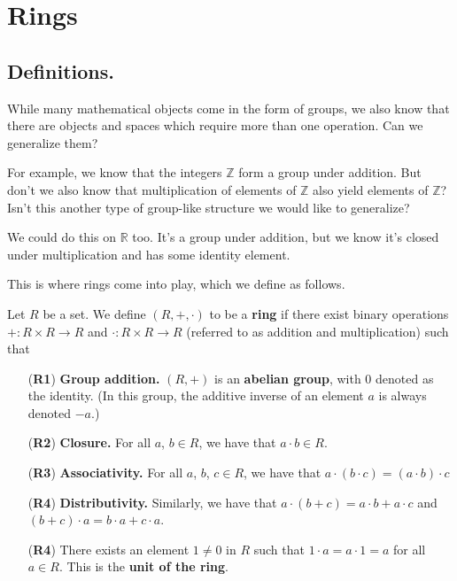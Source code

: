 \chapter{Rings}
\section{Definitions.}

While many mathematical objects come in the form of groups, we
also know that there are objects and spaces which require more
than one operation. Can we generalize them?

For example, we know that the integers $\mathbb{Z}$ form a group
under addition. But don't we also know that multiplication of
elements of $\mathbb{Z}$ also yield elements of $\mathbb{Z}$?
Isn't this another type of group-like structure we would like to
generalize?

We could do this on $\mathbb{R}$ too. It's a group under addition,
but we know it's closed under multiplication and has some identity
element.

This is where rings come into play, which we define as follows. 

\begin{definition}
    Let $R$ be a set. We define $(R, +, \cdot)$ to be a \textbf{ring} if there
    exist binary operations $+: R\times R \to R$ and $\cdot: R
    \times R \to R$ (referred to as addition and multiplication)
    such that 
    \begin{itemize}
        \item[(\textbf{R1})] \textbf{Group addition.} $(R, +)$ is an
        \textbf{abelian group}, with $0$ denoted as the
        identity. (In this group, the additive inverse of
        an element $a$ is always denoted $-a$.)
        \item[(\textbf{R2})] \textbf{Closure.} For all $a$, $b \in R$, we have that $a \cdot b \in R$.
        \item[(\textbf{R3})] \textbf{Associativity.} For all $a$, $b$, $c \in R$, we have that $a \cdot (b \cdot c) = (a \cdot b) \cdot c$
        \item[(\textbf{R4})] \textbf{Distributivity.} Similarly, we have that $a \cdot (b + c) = a\cdot b + a \cdot c$ and $(b
        + c) \cdot a = b \cdot a + c \cdot a$.
        \item[(\textbf{R4})] There exists an element $1 \ne 0$ in $R$ such that 
        $1 \cdot a = a \cdot 1 = a$ for all $a \in R$. This is the \textbf{unit of the ring}. 
    \end{itemize}
\end{definition}

